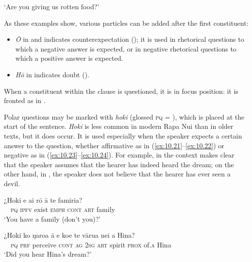 \glt
‘Are you giving us rotten food?’ \textstyleExampleref{[R310.260]} 
\z

As these examples show, various particles can be added after the first constituent:

\begin{itemize}
\item 
\textit{{\ꞌ}Ō} in  and  indicates counterexpectation (); it is used in rhetorical questions to which a negative answer is expected, or in negative rhetorical questions to which a positive answer is expected.

\item 
\textit{Hō} in  indicates doubt ().

\end{itemize}

When a constituent within the clause is questioned, it is in focus position: it is fronted as in .

Polar questions may be marked with \textit{hoki} (glossed \textsc{pq} = ), which is placed at the start of the sentence. \textit{Hoki} is less common in modern Rapa Nui than in older texts, but it does occur. It is used especially when the speaker expects a certain answer to the question, whether affirmative as in (\ref{ex:10.21}–\ref{ex:10.22}) or negative as in (\ref{ex:10.23}–\ref{ex:10.24}). For example, in  the context makes clear that the speaker assumes that the hearer has indeed heard the dream; on the other hand, in , the speaker does not believe that the hearer has ever seen a devil.

\ea\label{ex:10.21}
\gll ¿Hoki e ai rō {\ꞌ}ā te famiria? \\
~~\textsc{pq} \textsc{ipfv} exist \textsc{emph} \textsc{cont} \textsc{art} family \\

\glt 
‘You have a family (don’t you)?’ \textstyleExampleref{[R103.093]} 
\z

\ea\label{ex:10.22}
\gll ¿Hoki ko ŋaro{\ꞌ}a {\ꞌ}ā e koe te vārua nei {\ꞌ}a Hina? \\
~~\textsc{pq} \textsc{prf} perceive \textsc{cont} \textsc{ag} \textsc{2sg} \textsc{art} spirit \textsc{prox} of\textsc{.a} Hina \\

\glt 
‘Did you hear Hina’s dream?’ \textstyleExampleref{[R313.087]} 
\z

